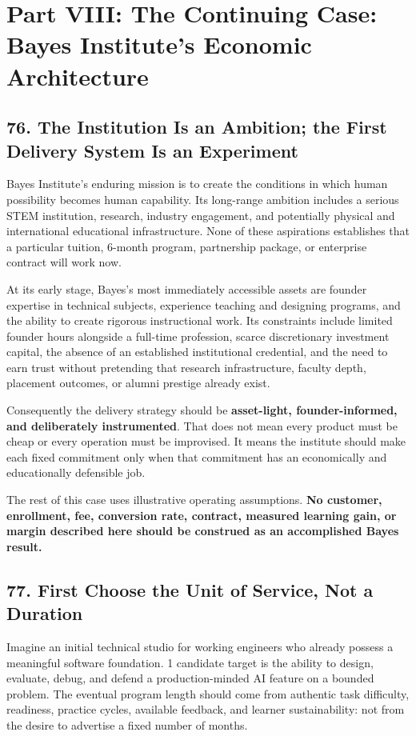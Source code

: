 \section*{Part VIII: The Continuing Case: Bayes Institute's Economic Architecture}

\subsection*{76. The Institution Is an Ambition; the First Delivery System Is an Experiment}

Bayes Institute's enduring mission is to create the conditions in which human possibility becomes human capability. Its long-range ambition includes a serious STEM institution, research, industry engagement, and potentially physical and international educational infrastructure. None of these aspirations establishes that a particular tuition, 6-month program, partnership package, or enterprise contract will work now.

At its early stage, Bayes's most immediately accessible assets are founder expertise in technical subjects, experience teaching and designing programs, and the ability to create rigorous instructional work. Its constraints include limited founder hours alongside a full-time profession, scarce discretionary investment capital, the absence of an established institutional credential, and the need to earn trust without pretending that research infrastructure, faculty depth, placement outcomes, or alumni prestige already exist.

Consequently the delivery strategy should be \textbf{asset-light, founder-informed, and deliberately instrumented}. That does not mean every product must be cheap or every operation must be improvised. It means the institute should make each fixed commitment only when that commitment has an economically and educationally defensible job.

The rest of this case uses illustrative operating assumptions. \textbf{No customer, enrollment, fee, conversion rate, contract, measured learning gain, or margin described here should be construed as an accomplished Bayes result.}

\subsection*{77. First Choose the Unit of Service, Not a Duration}

Imagine an initial technical studio for working engineers who already possess a meaningful software foundation. 1 candidate target is the ability to design, evaluate, debug, and defend a production-minded AI feature on a bounded problem. The eventual program length should come from authentic task difficulty, readiness, practice cycles, available feedback, and learner sustainability: not from the desire to advertise a fixed number of months.

